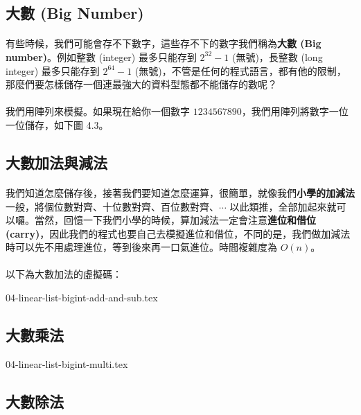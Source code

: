 \documentclass[12pt,a4paper,oneside]{report}
\begin{document}
\begin{CJK}{UTF8}{bkai}
\section{大數 (Big Number)}

\paragraph{}有些時候，我們可能會存不下數字，這些存不下的數字我們稱為\textbf{大數 (Big number)}。例如整數 (integer) 最多只能存到 $2^{32}-1$ (無號)，長整數 (long integer) 最多只能存到 $2^{64}-1$ (無號)，不管是任何的程式語言，都有他的限制，那麼們要怎樣儲存一個連最強大的資料型態都不能儲存的數呢？

\paragraph{}我們用陣列來模擬。如果現在給你一個數字 $1234567890$，我們用陣列將數字一位一位儲存，如下圖 4.3。

\subsection{大數加法與減法}
\paragraph{}我們知道怎麼儲存後，接著我們要知道怎麼運算，很簡單，就像我們\textbf{小學的加減法}一般，將個位數對齊、十位數對齊、百位數對齊、$\cdots$ 以此類推，全部加起來就可以囉。當然，回憶一下我們小學的時候，算加減法一定會注意\textbf{進位和借位 (carry)}，因此我們的程式也要自己去模擬進位和借位，不同的是，我們做加減法時可以先不用處理進位，等到後來再一口氣進位。時間複雜度為 $O(n)$。

\paragraph{}以下為大數加法的虛擬碼：

{04-linear-list-bigint-add-and-sub.tex}

\subsection{大數乘法}

{04-linear-list-bigint-multi.tex}

\subsection{大數除法}


\end{CJK}
\end{document}
